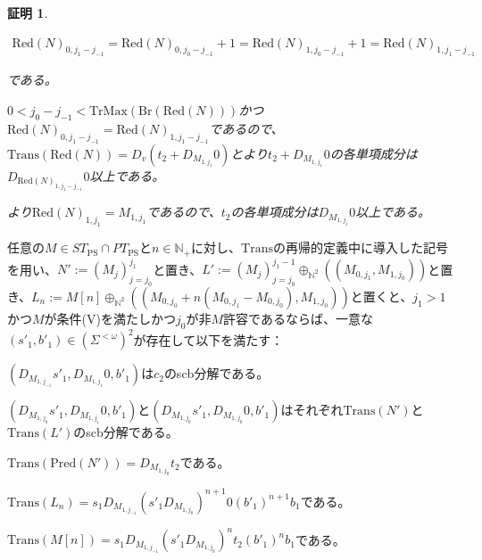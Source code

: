 \documentclass[dvipdfmx,uplatex]{jsarticle}
\theoremstyle{customnonumberbreakfortheorem}
\theoremstyle{customnonumberbreakforproof}
\newtheorem{hideableproof}{証明}
\begin{document}
\begin{hideableproof}
\begin{indented}
		\begin{eqnarray*}
		\textrm{Red}(N)_{0,j_1-j_{-1}} = \textrm{Red}(N)_{0,j_0-j_{-1}}+1 = \textrm{Red}(N)_{1,j_0-j_{-1}}+1 = \textrm{Red}(N)_{1,j_1-j_{-1}}
		\end{eqnarray*}
		\item である。
		\item \(0 < j_0-j_{-1} < \textrm{TrMax}(\textrm{Br}(\textrm{Red}(N)))\)かつ\(\textrm{Red}(N)_{0,j_1-j_{-1}} = \textrm{Red}(N)_{1,j_1-j_{-1}}\)であるので、\(\textrm{Trans}(\textrm{Red}(N)) = D_v(t_2 + D_{M_{1,j_1}} 0)\)とより\(t_2 + D_{M_{1,j_1}} 0\)の各単項成分は\(D_{\textrm{Red}(N)_{1,j_1-j_{-1}}} 0\)以上である。
		\item {}より\(\textrm{Red}(N)_{1,j_1} = M_{1,j_1}\)であるので、\(t_2\)の各単項成分は\(D_{M_{1,j_1}} 0\)以上である。
	\end{indented}
\end{hideableproof}

\begin{lemma}[条件(V)の下での各種scb分解]\label{条件(V)の下での各種scb分解}
	任意の\(M \in ST_{\textrm{PS}} \cap PT_{\textrm{PS}}\)と\(n \in \mathbb{N}_{+}\)に対し、\(\textrm{Trans}\)の再帰的定義中に導入した記号を用い、\(N' := (M_j)_{j=j_0}^{j_1}\)と置き、\(L' := (M_j)_{j=j_0}^{j_1-1} \oplus_{\mathbb{N}^2} ((M_{0,j_1},M_{1,j_0}))\)と置き、\(L_n := M[n] \oplus_{\mathbb{N}^2} ((M_{0,j_0}+n(M_{0,j_1}-M_{0,j_0}),M_{1,j_0}))\)と置くと\footnotemark{}、\(j_1 > 1\)かつ\(M\)が条件(V)を満たし\footnotemark{}かつ\(j_0\)が非\(M\)許容であるならば、一意な\((s'_1,b'_1) \in (\Sigma^{< \omega})^2\)が存在して以下を満たす：
	\begin{penumerate}
		\item \((D_{M_{1,j_{-1}}} s'_1,D_{M_{1,j_1}} 0,b'_1)\)は\(c_2\)のscb分解である。
		\item \((D_{M_{1,j_0}} s'_1,D_{M_{1,j_1}} 0,b'_1)\)と\((D_{M_{1,j_0}} s'_1,D_{M_{1,j_0}} 0,b'_1)\)はそれぞれ\(\textrm{Trans}(N')\)と\(\textrm{Trans}(L')\)のscb分解である。
		\item \(\textrm{Trans}(\textrm{Pred}(N')) = D_{M_{1,j_0}} t_2\)である。
		\item \(\textrm{Trans}(L_n) = s_1 D_{M_{1,j_{-1}}} (s'_1 D_{M_{1,j_0}})^{n+1} 0 (b'_1)^{n+1} b_1\)である。
		\item \(\textrm{Trans}(M[n]) = s_1 D_{M_{1,j_{-1}}} (s'_1 D_{M_{1,j_0}})^n t_2 (b'_1)^n b_1\)である。
	\end{penumerate}
\end{lemma}
\addtocounter{footnote}{-1}
\addtocounter{footnote}{1}
\end{document}
